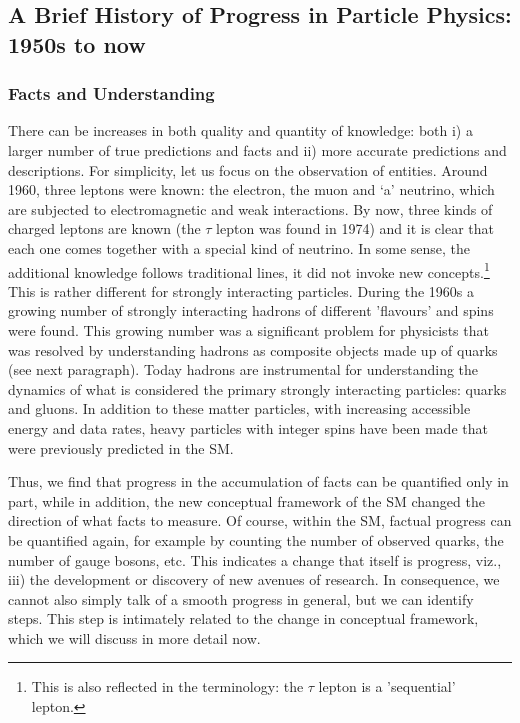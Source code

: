

\subsection{A Brief History of Progress in Particle Physics: 1950s to now}	\label{history}

\subsubsection{Facts and Understanding}

There can be increases in both quality and quantity of knowledge: both i) a larger number of true predictions and facts and ii) more accurate predictions and descriptions.
For simplicity, let us focus on the observation of entities.
Around 1960, three leptons were known: the electron, the muon and `a' neutrino, which are subjected to electromagnetic and weak interactions.
By now, three kinds of charged leptons are known (the $\tau $ lepton was found in 1974) and it is clear that each one comes together with a special kind of neutrino. 
In some sense, the additional knowledge follows traditional lines, it did not invoke new concepts.\footnote{This is also reflected in the terminology: the $\tau $ lepton is a 'sequential' lepton.} 
This is rather different for strongly interacting particles.
During the 1960s a growing number of strongly interacting hadrons of different 'flavours' and spins were found.
This growing number was a significant problem for physicists that was resolved by understanding hadrons as composite objects made up of quarks (see next paragraph). 
Today hadrons are instrumental for understanding the dynamics of what is considered the primary strongly interacting particles: quarks and gluons.
In addition to these matter particles, with increasing accessible energy and data rates, heavy particles with integer spins have been made that were previously predicted in the SM.

Thus, we find that progress in the accumulation of facts can be quantified only in part, while in addition, the new conceptual framework of the SM changed the direction of what facts to measure. 
Of course, within the SM, factual progress can be quantified again, for example by counting the number of observed quarks, the number of gauge bosons, etc. 
This indicates a change that itself is progress, viz., iii) the development or discovery of new avenues of research. 
In consequence, we cannot also simply talk of a smooth progress in general, but we can identify steps.
This step is intimately related to the change in conceptual framework, which we will discuss in more detail now.

